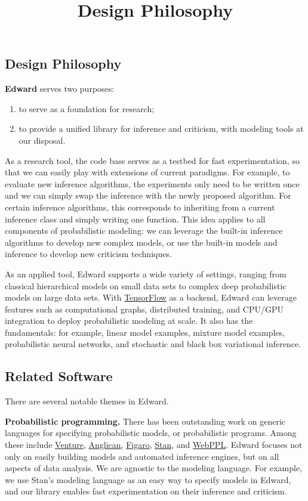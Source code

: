 \title{Design Philosophy}

\subsection{Design Philosophy}

\textbf{Edward} serves two purposes:

\begin{enumerate}
\def\labelenumi{\arabic{enumi}.}
\item
  to serve as a foundation for research;
\item
  to provide a unified library for inference and criticism, with
  modeling tools at our disposal.
\end{enumerate}

As a research tool, the code base serves as a testbed for fast
experimentation, so that we can easily play with extensions of current
paradigms. For example, to evaluate new inference algorithms, the
experiments only need to be written once and we can simply swap the
inference with the newly proposed algorithm. For certain inference
algorithms, this corresponds to inheriting from a current inference
class and simply writing one function. This idea applies to all
components of probabilistic modeling: we can leverage the built-in
inference algorithms to develop new complex models, or use the
built-in models and inference to develop new criticism techniques.

As an applied tool, Edward supports a wide variety of settings,
ranging from classical hierarchical models on small data sets to
complex deep probabilistic models on large data sets. With
\href{https://www.tensorflow.org}{TensorFlow} as a backend, Edward can
leverage features such as computational graphs, distributed training,
and CPU/GPU integration to deploy probabilistic modeling at scale. It
also has the fundamentals: for example, linear model examples, mixture
model examples, probabilistic neural networks, and stochastic and
black box variational inference.

\subsection{Related Software}\label{related-software}

There are several notable themes in Edward.

\textbf{Probabilistic programming.}
There has been outstanding work on generic
languages for specifying probabilistic models, or probabilistic
programs. Among these include
\href{http://probcomp.csail.mit.edu/venture/}{Venture},
\href{http://www.robots.ox.ac.uk/~fwood/anglican/literature/index.html}{Anglican},
\href{https://www.cra.com/work/case-studies/figaro}{Figaro},
\href{http://mc-stan.org}{Stan}, and
\href{http://dippl.org/chapters/02-webppl.html}{WebPPL}.
Edward focuses not only on easily building models and
automated inference engines, but on
all aspects of data analysis.
We are agnostic to the modeling language.
For example,
we use Stan's modeling language as an easy way to specify models in
Edward, and our library enables fast experimentation on their
inference and criticism.

